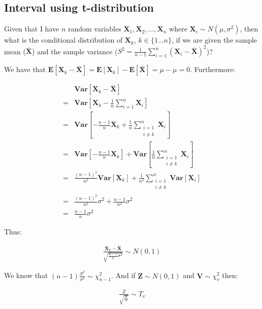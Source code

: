 \subsection{Interval using t-distribution}
\label{subsec:back_interval_t}
Given that I have $n$ random variables $\mathbf{X}_1, \mathbf{X}_2, \dots, \mathbf{X}_n$ where $\mathbf{X}_i \sim N(\mu, \sigma^2)$, then what is the conditional distribution of $\mathbf{X}_k$, $k \in \{1 \dots n\}$, if we are given the sample mean ($\mathbf{\bar{X}}$) and the sample variance ($S^2 = \frac{1}{n-1} \sum_{i=1}^n \left(\mathbf{X}_i - \mathbf{\bar{X}}\right)^2$)?

We have that $\mathbf{E}[\mathbf{X}_k - \mathbf{\bar{X}}] = \mathbf{E}[\mathbf{X}_k] - \mathbf{E}[\mathbf{\bar{X}}] = \mu - \mu = 0$. Furthermore:

\begin{align*}
  & \mathbf{Var}[\mathbf{X}_k - \mathbf{\bar{X}}] \\
= & \mathbf{Var}[\mathbf{X}_k - \frac{1}{n}\sum_{i=1}^n \mathbf{X}_i] \\
= & \mathbf{Var}[- \frac{n-1}{n} \mathbf{X}_k + \frac{1}{n}\sum_{\substack{i=1 \\ i \not = k}}^n \mathbf{X}_i] \\
= & \mathbf{Var}[- \frac{n-1}{n} \mathbf{X}_k] + \mathbf{Var}[\frac{1}{n}\sum_{\substack{i=1 \\ i \not = k}}^n \mathbf{X}_i] \\
= & \frac{\left(n-1\right)^2}{n^2} \mathbf{Var}[\mathbf{X}_k] + \frac{1}{n^2} \sum_{\substack{i=1 \\ i \not = k}}^n \mathbf{Var}[\mathbf{X}_i] \\ 
= & \frac{\left(n-1\right)^2}{n^2} \sigma^2 + \frac{n-1}{n^2} \sigma^2 \\
= & \frac{n - 1}{n} \sigma^2
\end{align*}

Thus:

\begin{align*}
    \frac{\mathbf{X}_k - \mathbf{\bar{X}}}{\sqrt{\frac{n-1}{n}\sigma^2}} \sim N(0, 1)
\end{align*}

We know that $(n-1) \frac{S^2}{\sigma^2} \sim \chi^2_{n-1}$. And if $\mathbf{Z} \sim N(0,1)$ and $\mathbf{V} \sim \chi^2_{v}$ then:

\begin{align*}
    \frac{Z}{\sqrt{\frac{\mathbf{V}}{v}}} \sim T_v
\end{align*}

